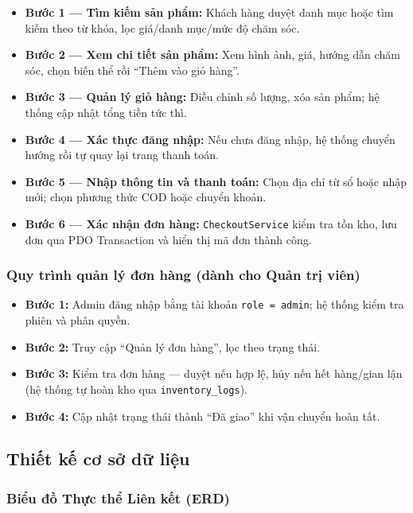 \documentclass[11pt, a4paper]{article}
\begin{document}
\begin{itemize}[leftmargin=*]
    \item \textbf{Bước 1 --- Tìm kiếm sản phẩm:} Khách hàng duyệt danh mục hoặc tìm kiếm theo từ khóa, lọc giá/danh mục/mức độ chăm sóc.
    \item \textbf{Bước 2 --- Xem chi tiết sản phẩm:} Xem hình ảnh, giá, hướng dẫn chăm sóc, chọn biến thể rồi ``Thêm vào giỏ hàng''.
    \item \textbf{Bước 3 --- Quản lý giỏ hàng:} Điều chỉnh số lượng, xóa sản phẩm; hệ thống cập nhật tổng tiền tức thì.
    \item \textbf{Bước 4 --- Xác thực đăng nhập:} Nếu chưa đăng nhập, hệ thống chuyển hướng rồi tự quay lại trang thanh toán.
    \item \textbf{Bước 5 --- Nhập thông tin và thanh toán:} Chọn địa chỉ từ sổ hoặc nhập mới; chọn phương thức COD hoặc chuyển khoản.
    \item \textbf{Bước 6 --- Xác nhận đơn hàng:} \texttt{CheckoutService} kiểm tra tồn kho, lưu đơn qua PDO Transaction và hiển thị mã đơn thành công.
\end{itemize}

\subsubsection{Quy trình quản lý đơn hàng (dành cho Quản trị viên)}

\begin{itemize}[leftmargin=*]
    \item \textbf{Bước 1:} Admin đăng nhập bằng tài khoản \texttt{role = admin}; hệ thống kiểm tra phiên và phân quyền.
    \item \textbf{Bước 2:} Truy cập ``Quản lý đơn hàng'', lọc theo trạng thái.
    \item \textbf{Bước 3:} Kiểm tra đơn hàng --- duyệt nếu hợp lệ, hủy nếu hết hàng/gian lận (hệ thống tự hoàn kho qua \texttt{inventory\_logs}).
    \item \textbf{Bước 4:} Cập nhật trạng thái thành ``Đã giao'' khi vận chuyển hoàn tất.
\end{itemize}

\subsection{Thiết kế cơ sở dữ liệu}

\subsubsection{Biểu đồ Thực thể Liên kết (ERD)}
\end{document}
